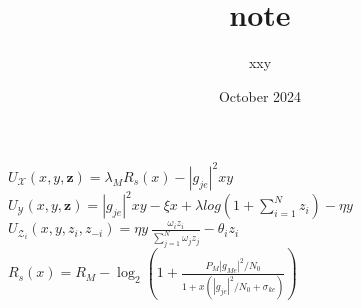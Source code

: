 \documentclass{article}
\title{note}
\author{xxy}
\date{October 2024}
\begin{document}
\maketitle


\begin{flushleft}
    $U_\mathcal{X}(x,y,\boldsymbol{z})=\lambda_M R_{s}(x)-|g_{je}|^2xy$\\
    $U_\mathcal{Y}(x,y,\boldsymbol{z})=|g_{je}|^2xy-\xi x+\lambda log(1+\sum_{i=1}^{N}z_i)-\eta{y}$\\
    $U_{\mathcal{Z}_i}(x,y,z_i,z_{-i})=\eta {y} \ \frac{\omega_i z_i}{\sum_{j=1}^{N}\omega_j z_j}-\theta_i z_i$\\
   $R_s(x)=
R_M -\log_2\left(1 + \frac{P_M |g_{Me}|^2 / N_0}{1 + x \left( |g_{je}|^2 / N_0 + \sigma_{ke} \right)} \right)
$
\end{flushleft}
\end{document}
